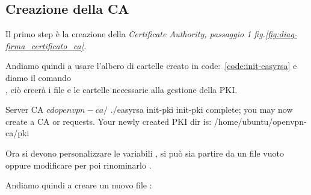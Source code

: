 \subsection{Creazione della CA} %

Il primo step è la creazione della \it{Certificate Authority}, passaggio 1 fig.\ref{fig:diag-firma_certificato_ca}. 

Andiamo quindi a usare l'albero di cartelle creato in code:~\ref{code:init-easyrsa} e diamo il comando \\, ciò creerà i file e le cartelle necessarie alla gestione della PKI.

\begin{bashcode}{Server CA}{}
$ cd openvpn-ca/
$ ./easyrsa init-pki
init-pki complete; you may now create a CA or requests.
Your newly created PKI dir is: /home/ubuntu/openvpn-ca/pki
\end{bashcode}

Ora si devono personalizzare le variabili , si può sia partire da un file vuoto oppure modificare  per poi rinominarlo .

Andiamo quindi a creare un nuovo file :

